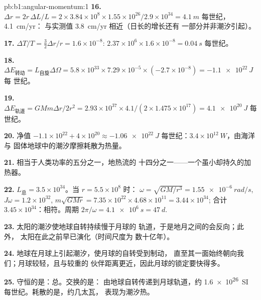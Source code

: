 \begin{solution}{pb:b1:angular-momentum:1}
\textbf{16.} $\Delta r = 2r\,\Delta L/L = 2 \times 3.84\times10^8 \times 1.55
\times10^{26}/2.9\times10^{34} = \qty{4.1}{m}$ 每世纪，\qty{4.1}{cm/yr}：
与实测值 \qty{3.8}{cm/yr} 相近（日长的增长还有
一部分并非潮汐引起）。

\textbf{17.} $\Delta T/T = \tfrac32\Delta r/r = 1.6\times10^{-8}$: $2.37\times
10^6 \times 1.6\times10^{-8} = \qty{0.04}{s}$ 每世纪。

\textbf{18.} $\Delta E_{\text{转动}} = L_{\text{自旋}}\Delta\Omega = 5.8\times10^{33}
\times 7.29\times10^{-5} \times (-2.7\times10^{-8}) = \qty{-1.1e22}{J}$ 每
世纪。

\textbf{19.} $\Delta E_{\text{轨道}} = GMm\Delta r/2r^2 = 2.93\times10^{37}
\times 4.1/(2 \times 1.475\times10^{17}) = \qty{+4.1e20}{J}$ 每世纪。

\textbf{20.} 净值 $-1.1\times10^{22} + 4\times10^{20} \approx \qty{-1.06e22}{J}$
每世纪：$3.4\times10^{12}\ \unit{W}$，由海洋与
固体地球中的潮汐摩擦耗散为热量。

\textbf{21.} 相当于人类功率的五分之一，地热流的
十四分之一——一个虽小却持久的加热器。

\textbf{22.} $L_{\text{总}} = 3.5\times10^{34}$。当 $r = 5.5\times10^8$ 时：
$\omega = \sqrt{GM/r^3} = \qty{1.55e-6}{rad/s}$, $J\omega = 1.2\times10^{32}$,
$m\sqrt{GMr} = 7.35\times10^{22} \times 4.68\times10^{11} = 3.44\times10^{34}$;
合计 $3.45\times10^{34}$：相符。周期 $2\pi/\omega = \qty{4.1e6}{s}
= \qty{47}{d}$.

\textbf{23.} 太阳的潮汐使地球自转持续慢于月球的
轨道，于是地月之间的会反向；此外，
太阳在此之前早已演化（时间尺度为
数十亿年）。

\textbf{24.} 地球在月球上引起潮汐，使月球的自转受到制动，
直至其一面始终朝向我们；月球较轻，且与较重的
伙伴距离更近，因此月球的锁定要快得多。

\textbf{25.} 守恒的是：总。交换的是：
由地球自转传递到月球轨道，约 \qty{1.6e26}{SI}
每世纪。耗散的是，约几太瓦，
表现为潮汐热。
\end{solution}
